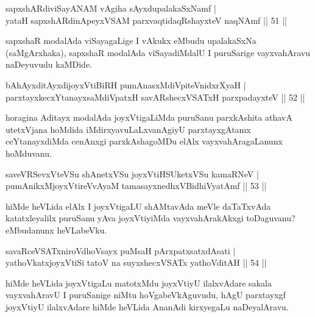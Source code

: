 \begin{shl}
sapxshARdiviSayANAM vAgiha sAyxdupalakaSxNamf | \\
yataH sapxshARdinA\s peyxVSAM parxvaqtidaqRshayxteV naqNAmf \hfill||  51 ||  
\end{shl}

\begin{artha}
sapxshaR modalAda viSayagaLige I vAkukx eMbudu upalakaSxNa (saMgArxhaka), sapxshaR modalAda viSayadiMdalU I puruSarige vayxvahAravu naDeyuvudu kaMDide.
\end{artha}


\begin{shl}
bAhAyxditAyxdijoyxVtiBiRH pumAnasxMdiVpiteVnidxrXyaH | \\
parxtayxkecxYtanayxsaMdiVpatxH savARshecxVSATxH parxpadayxteV \hfill||  52 ||  
\end{shl}

\begin{artha}
horagina Aditayx modalAda joyxVtigaLiMda puruSanu parxkAshita athavA utetxVjana hoMdida iMdirxyavuLaLxvanAgiyU parxtayxgAtamx ceYtanayxdiMda cenAnxgi parxkAshagoMDu elAlx vayxvahAragaLanunx hoMduvanu.
\end{artha}

\begin{shl}
saveVRSevxVteVSu shAnetxVSu joyxVtiHSUketxVSu kamaRNeV | \\
pumAnikxMjoyxVtireVvAyaM tamasayxnedhxV\s BidhiVyatAmf \hfill||  53 ||  
\end{shl}

\begin{artha}
hiMde heVLida elAlx I joyxVtigaLU shAMtavAda meVle daTaTxvAda katatxleyalilx puruSanu yAva joyxVtiyiMda vayxvahArakAkxgi toDaguvanu? eMbudanunx heVLabeVku.
\end{artha}


\begin{shl}
savaRceVSATxniroVdhoV\s sayx puMsaH pArxpatxsatxdA\s sati | \\
yathoVkatxjoyxVtiSi tatoV na suyxshecxVSATx yathoVditAH \hfill||  54 ||  
\end{shl}

\begin{artha}
hiMde heVLida joyxVtigaLu matotxMdu joyxVtiyU ilalxvAdare sakala vayxvahAravU I puruSanige niMtu hoVgabeVkAguvudu, hAgU parxtayxgf joyxVtiyU ilalxvAdare hiMde heVLida AnanAdi kirxyegaLu naDeyalAravu.
\end{artha}

